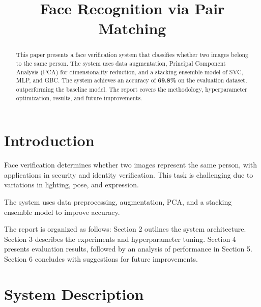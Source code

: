 \documentclass[a4paper]{article}
\title{Face Recognition via Pair Matching}
\begin{document}
\maketitle

%
%

\begin{abstract}
    This paper presents a face verification system that classifies whether two images belong to the same person. The system uses data augmentation, Principal Component Analysis (PCA) for dimensionality reduction, and a stacking ensemble model of SVC, MLP, and GBC. The system achieves an accuracy of \textbf{69.8\%} on the evaluation dataset, outperforming the baseline model. The report covers the methodology, hyperparameter optimization, results, and future improvements.


\end{abstract}

\section{Introduction}

%

    Face verification determines whether two images represent the same person, with applications in security and identity verification. This task is challenging due to variations in lighting, pose, and expression. 

    The system uses data preprocessing, augmentation, PCA, and a stacking ensemble model to improve accuracy. 

    The report is organized as follows: Section 2 outlines the system architecture. Section 3 describes the experiments and hyperparameter tuning. Section 4 presents evaluation results, followed by an analysis of performance in Section 5. Section 6 concludes with suggestions for future improvements.

\section{System Description}
\end{document}
